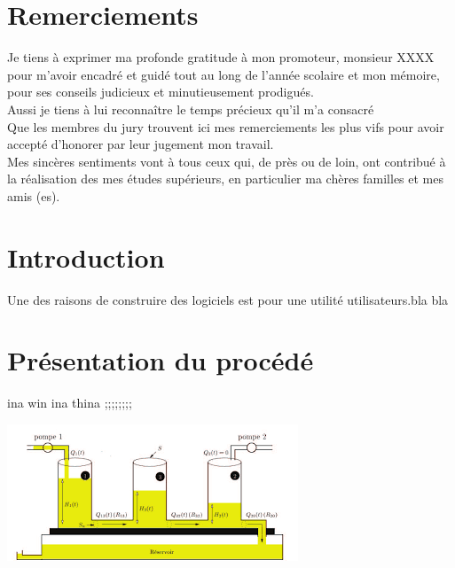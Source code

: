 \documentclass[12pt, a4paper, openany]{report}
\begin{document}
\makeatother



\chapter*{Remerciements}

  Je tiens à exprimer ma profonde gratitude à mon promoteur, monsieur XXXX pour m'avoir encadré et guidé tout au long de l'année scolaire et mon mémoire, pour ses conseils judicieux et minutieusement prodigués.\\
  
  Aussi je tiens à lui reconnaître le temps précieux qu’il m'a consacré \\
  
   Que les membres du jury trouvent ici mes remerciements les plus vifs pour avoir accepté d’honorer par leur jugement mon travail.\\
   
   Mes sincères sentiments vont à tous ceux qui, de près ou de loin, ont contribué à la réalisation des mes études supérieurs, en particulier ma chères familles et mes amis (es).\\
   
   
\renewcommand{\contentsname}{Sommaire}
\tableofcontents



\chapter*{Introduction}
 
  Une des raisons de construire des logiciels est pour une utilité utilisateurs.bla bla
    
 \chapter*{Présentation du procédé}
ina win ina thina ;;;;;;;;

	\begin{center}
    \includegraphics[scale=1]{troisBacs.png}
    \label{fig1}
    \end{center}
\end{document}
